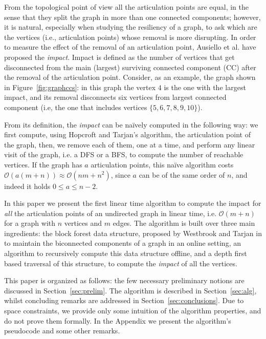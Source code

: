 \documentclass{llncs}
\newcommand{\bigoh}{\mathcal{O}}
\begin{document}
From the topological point of view all the articulation points are equal, in the sense that they split the graph in more than one connected components; however, it is natural, especially when studying the resiliency of a graph, to ask which are the vertices (i.e., articulation points) whose removal is more disrupting. In order to measure the effect of the removal of an articulation point, Ausiello et al. \cite{AFL12} have proposed the \emph{impact}. Impact is defined as the number of vertices that get disconnected from the main (largest) surviving connected component (CC) after the removal of the articulation point. Consider, as an example, the graph shown in Figure~\ref{fig:graphccs}: in this graph the vertex $4$ is the one with the largest impact, and its removal disconnects six vertices from largest connected component (i.e, the one that includes vertices $\{5,6,7,8,9,10\}$).

From its definition, the \emph{impact} can be na\"ively computed in the following way: we first compute, using Hopcroft and Tarjan's algorithm, the articulation point of the graph, then, we remove each of them, one at a time, and perform any linear visit of the graph, i.e. a DFS or a BFS, to compute the number of reachable vertices. If the graph has $a$ articulation points, this na\"ive algorithm costs $\bigoh(a(m+n))\approx\bigoh(nm+n^2)$, since $a$ can be of the same order of $n$, and indeed it holds $0\leq a \leq n-2$.

In this paper we present the first linear time algorithm to compute the impact for \emph{all} the articulation points of an undirected graph in linear time, i.e. $\bigoh(m+n)$ for a graph with $n$ vertices and $m$ edges. The algorithm is built over three main ingredients: the block forest data structure, proposed by Westbrook and Tarjan in \cite{WT92} to maintain the biconnected components of a graph in an online setting, an algorithm to recursively compute this data structure offline, and a depth first based traversal of this structure, to compute the \emph{impact} of all the vertices. 

This paper is organized as follows: the few necessary preliminary notions are discussed in Section~\ref{sec:prelim}. The algorithm is described in Section~\ref{sec:alg}, whilst concluding remarks are addressed in Section~\ref{sec:conclusions}. Due to space constraints, we provide only some intuition of the algorithm properties, and do not prove them formally. In the Appendix we present the algorithm's pseudocode and some other remarks.
\end{document}
